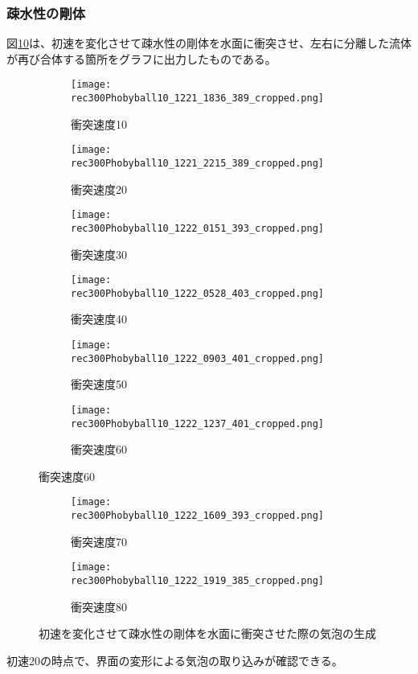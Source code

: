 \documentclass[]{jsarticle}
\begin{document}
\subsubsection{疎水性の剛体}
図\ref{fig:hydrophobic}は、初速を変化させて疎水性の剛体を水面に衝突させ、左右に分離した流体が再び合体する箇所をグラフに出力したものである。
\begin{figure}[H]
  \centering
\begin{subfigure}{0.3\columnwidth}
  \centering
  \texttt{[image: rec300Phobyball10\_1221\_1836\_389\_cropped.png]}
  \caption{衝突速度10}
  \label{fig:vel10}
\end{subfigure}
\begin{subfigure}{0.3\columnwidth}
  \centering
  \texttt{[image: rec300Phobyball10\_1221\_2215\_389\_cropped.png]}
  \caption{衝突速度20}
  \label{fig:vel20}
\end{subfigure}
\begin{subfigure}{0.3\columnwidth}
  \centering
  \texttt{[image: rec300Phobyball10\_1222\_0151\_393\_cropped.png]}
  \caption{衝突速度30}
  \label{fig:vel30}
\end{subfigure}
\begin{subfigure}{0.3\columnwidth}
  \centering
  \texttt{[image: rec300Phobyball10\_1222\_0528\_403\_cropped.png]}
  \caption{衝突速度40}
  \label{fig:vel40}
\end{subfigure}
\begin{subfigure}{0.3\columnwidth}
  \centering
  \texttt{[image: rec300Phobyball10\_1222\_0903\_401\_cropped.png]}
  \caption{衝突速度50}
  \label{fig:vel50}
\end{subfigure}
\begin{subfigure}{0.3\columnwidth}
  \centering
  \texttt{[image: rec300Phobyball10\_1222\_1237\_401\_cropped.png]}
  \caption{衝突速度60}
  \label{fig:vel60}
\end{subfigure}
\end{figure}
\clearpage
\begin{figure}
\ContinuedFloat
  \begin{subfigure}{0.3\columnwidth}
  \centering
  \texttt{[image: rec300Phobyball10\_1222\_1609\_393\_cropped.png]}
  \caption{衝突速度70}
  \label{fig:vel70}
\end{subfigure}
\begin{subfigure}{0.3\columnwidth}
  \centering
  \texttt{[image: rec300Phobyball10\_1222\_1919\_385\_cropped.png]}
  \caption{衝突速度80}
  \label{fig:vel80}
\end{subfigure}
\caption{初速を変化させて疎水性の剛体を水面に衝突させた際の気泡の生成}
\label{fig:hydrophobic}
\end{figure}
初速20の時点で、界面の変形による気泡の取り込みが確認できる。
\end{document}
